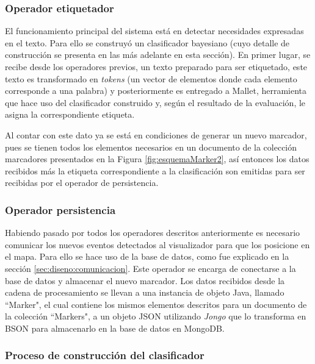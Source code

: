 \subsubsection*{Operador etiquetador}
\label{subsubsec:7op}

El funcionamiento principal del sistema está en detectar necesidades expresadas en el texto. Para ello se construyó un clasificador bayesiano (cuyo detalle de construcción se presenta en las más adelante en esta sección). En primer lugar, se recibe desde los operadores previos, un texto preparado para ser etiquetado, este texto es transformado en \textit{tokens} (un vector de elementos donde cada elemento corresponde a una palabra) y posteriormente es entregado a Mallet, herramienta que hace uso del clasificador construido y, según el resultado de la evaluación, le asigna la correspondiente etiqueta. 

Al contar con este dato ya se está en condiciones de generar un nuevo marcador, pues se tienen todos los elementos necesarios en un documento de la colección marcadores presentados en la Figura \ref{fig:esquemaMarker2}, así entonces los datos recibidos más la etiqueta correspondiente a la clasificación son emitidas para ser recibidas por el operador de persistencia.

\subsubsection*{Operador persistencia}
\label{subsubsec:8op}

Habiendo pasado por todos los operadores descritos anteriormente es necesario comunicar los nuevos eventos detectados al visualizador para que los posicione en el mapa. Para ello se hace uso de la base de datos, como fue explicado en la sección \ref{sec:diseno:comunicacion}.
Este operador se encarga de conectarse a la base de datos y almacenar el nuevo marcador. Los datos recibidos desde la cadena de procesamiento se llevan a una instancia de objeto Java, llamado ``Marker", el cual contiene los mismos elementos descritos para un documento de la colección ``Markers", a un objeto JSON utilizando \textit{Jongo} que lo transforma en BSON para almacenarlo en la base de datos en MongoDB.

\subsubsection*{Proceso de construcción del clasificador}
\label{subsubsec:clasificacion}

